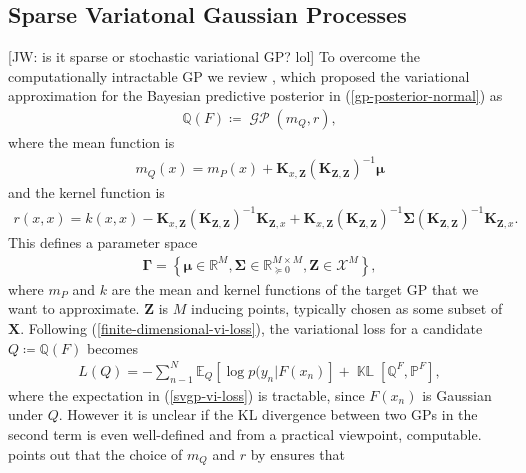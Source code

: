 \documentclass{article}
\newcommand{\jw}[1]{{\color{gray} [JW: #1]}}
\newcommand{\KLD}{\operatorname{\mathbb{KL}}}
\newcommand{\GP}{\operatorname{\mathcal{GP}}}
\numberwithin{equation}{section}
\begin{document}
\subsection{Sparse Variatonal Gaussian Processes}\label{section:svgp}
\jw{is it sparse or stochastic variational GP? lol}
To overcome the computationally intractable GP we review \cite{titsias2009variational}, which proposed the variational approximation for the Bayesian predictive posterior in (\ref{gp-posterior-normal}) as
\begin{align}
    \mathbb{Q}(F) \coloneqq \GP(m_Q, r),
\end{align}
where the mean function is
\begin{align}
    \label{svgp-mean} 
    m_Q(x) = m_P(x) + \mathbf{K}_{x, \mathbf{Z}}\left(\mathbf{K}_{\mathbf{Z}, \mathbf{Z}}\right)^{-1} \boldsymbol{\mu}
\end{align}
and the kernel function is
\begin{align}
r(x, x) = k(x, x) - \mathbf{K}_{x, \mathbf{Z}}\left(\mathbf{K}_{\mathbf{Z}, \mathbf{Z}}\right)^{-1} \mathbf{K}_{\mathbf{Z}, x} + \mathbf{K}_{x, \mathbf{Z}}\left(\mathbf{K}_{\mathbf{Z}, \mathbf{Z}}\right)^{-1}\mathbf{\Sigma}\left(\mathbf{K}_{\mathbf{Z}, \mathbf{Z}}\right)^{-1} \mathbf{K}_{\mathbf{Z}, x}.
\label{svgp-covariance}
\end{align}
This defines a parameter space 
\begin{align}
    \mathbf{\Gamma} = \left\{\boldsymbol{\mu} \in \mathbb{R}^{M}, \mathbf{\Sigma} \in \mathbb{R}^{M\times M}_{\succcurlyeq 0}, \mathbf{Z} \in \mathcal{X}^M \right\},
    \label{svgp-parameter-space}
\end{align}
where $m_P$ and $k$ are the mean and kernel functions of the target GP that we want to approximate. $\mathbf{Z}$ is $M$ inducing points, typically chosen as some subset of $\mathbf{X}$. 
Following (\ref{finite-dimensional-vi-loss}), the variational loss for a candidate $Q \coloneqq \mathbb{Q}(F)$ becomes
\begin{align}
L(Q) = -\sum_{n-1}^N \mathbb{E}_Q \left[\log p(y_n \vert F(x_n)\right] + \KLD\left[\mathbb{Q}^F, \mathbb{P}^F\right],
\label{svgp-vi-loss}
\end{align}
where the expectation in (\ref{svgp-vi-loss}) is tractable, since $F(x_n)$ is Gaussian under $Q$. 
However it is unclear if the KL divergence between two GPs in the second term is even well-defined and from a practical viewpoint, computable. 
\cite{matthews2016sparse} points out that the choice of $m_Q$ and $r$ by \cite{titsias2009variational} ensures that
\end{document}
